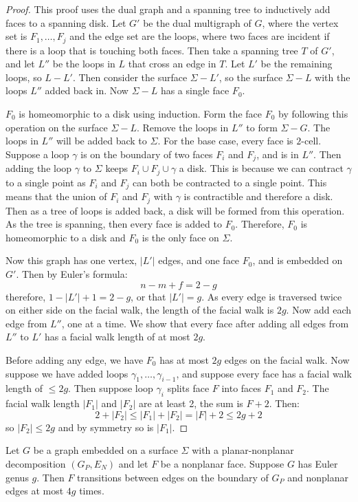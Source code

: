 \begin{proof}
	This proof uses the dual graph and a spanning tree to inductively add faces to a spanning disk. 
	Let \(G'\) be the dual multigraph of $G$, where the vertex set is \(F_1, \ldots, F_j\) and the edge set are the loops, where two faces are incident if there is a loop that is touching both faces. Then take a spanning tree \(T\) of \(G'\), and let \(L''\) be the loops in $L$ that cross an edge in \(T\). Let $L'$ be the remaining loops, so $L - L'$. 
	Then consider the surface \(\Sigma - L'\), so the surface $\Sigma - L$ with the loops $L''$ added back in. Now $\Sigma - L$ has a single face $F_0$.

	$F_0$ is homeomorphic to a disk using induction. Form the face $F_0$ by following this operation on the surface $\Sigma - L$. Remove the loops in $L''$ to form $\Sigma - G$. The loops in $L''$ will be added back to $\Sigma$. For the base case, every face is $2$-cell. Suppose a loop $\gamma$ is on the boundary of two faces $F_i$ and $F_j$, and is in $L''$. Then adding the loop $\gamma$ to $\Sigma$ keeps $F_i \cup F_j \cup \gamma$ a disk. This is because we can contract $\gamma$ to a single point as $F_i$ and $F_j$ can both be contracted to a single point. This means that the union of $F_i$ and $F_j$ with $\gamma$ is contractible and therefore a disk. Then as a tree of loops is added back, a disk will be formed from this operation. As the tree is spanning, then every face is added to $F_0$. Therefore, $F_0$ is homeomorphic to a disk and $F_0$ is the only face on $\Sigma$. 

	Now this graph has one vertex, \(|L'|\) edges, and one face \(F_0\), and is embedded on $G'$. Then by Euler's formula:
	\begin{equation}
		n - m + f = 2 - g
	\end{equation}
	therefore, \(1 - |L'| + 1 = 2 - g\), or that \(|L'| = g\). As every edge is traversed twice on either side on the facial walk, the length of the facial walk is \(2g\).
	Now add each edge from \(L''\), one at a time. We show that every face after adding all edges from \(L''\) to \(L'\) has a facial walk length of at most \(2g\).

	Before adding any edge, we have \(F_0\) has at most \(2g\) edges on the facial walk. Now suppose we have added loops \(\gamma_1, \ldots, \gamma_{i - 1}\), and suppose every face has a facial walk length of \(\leq 2g\).
	Then suppose loop \(\gamma_i\) splits face \(F\) into faces \(F_1\) and \(F_2\). The facial walk length \(|F_1|\) and \(|F_2|\) are at least 2, the sum is \(F + 2\). Then:
	\begin{equation}
		2 + |F_2| \leq |F_1| + |F_2| = |F| + 2 \leq 2g + 2
	\end{equation}
	so \(|F_2| \leq 2g\) and by symmetry so is \(|F_1|\).
\end{proof}
\begin{corollary}\label{corr:orientable_nonplanar_faces}
	Let \(G\) be a graph embedded on a surface \(\Sigma\) with a planar-nonplanar decomposition $(G_P, E_N)$ and let \(F\) be a nonplanar face. Suppose \(G\) has Euler genus \(g\). Then \(F\) transitions between edges on the boundary of $G_P$ and nonplanar edges at most $4g$ times.
\end{corollary}

